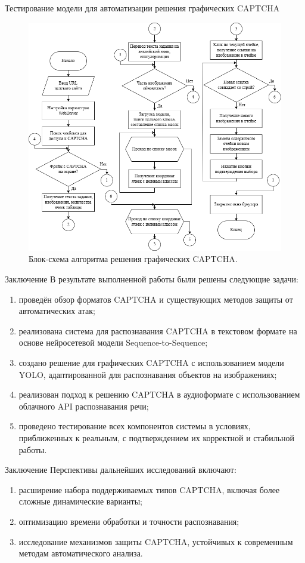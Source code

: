 \documentclass[12pt,a4paper,mathserif]{beamer}
\begin{document}
\begin{frame}{\footnotesize Тестирование модели для автоматизации решения графических CAPTCHA}
    \begin{figure}
        \centering
        \includegraphics[width=0.6\linewidth]{imgs/solve_captcha_flow.png}
        \caption{\centering Блок-схема алгоритма решения графических CAPTCHA.}
    \end{figure}
\end{frame}

\begin{frame}{Заключение}
    \setlength{\parindent}{0.5cm}
    В результате выполненной работы были решены следующие задачи:

    \begin{enumerate}
        \item проведён обзор форматов CAPTCHA и существующих методов защиты от 
        автоматических атак;
        \item реализована система для распознавания CAPTCHA в текстовом формате 
        на основе нейросетевой модели Sequence-to-Sequence;
        \item создано решение для графических CAPTCHA с использованием модели 
        YOLO, адаптированной для распознавания объектов на изображениях;
        \item реализован подход к решению CAPTCHA в аудиоформате с использованием 
        облачного API распознавания речи;
        \item проведено тестирование всех компонентов системы в условиях, 
        приближенных к реальным, с подтверждением их корректной и стабильной 
        работы.
    \end{enumerate}
\end{frame}

\begin{frame}{Заключение}
    \setlength{\parindent}{0.5cm}
    Перспективы дальнейших исследований включают:

    \begin{enumerate}
        \item расширение набора поддерживаемых типов CAPTCHA, включая более 
        сложные динамические варианты;
        \item оптимизацию времени обработки и точности распознавания;
        \item исследование механизмов защиты CAPTCHA, устойчивых к современным 
        методам автоматического анализа.
    \end{enumerate}
\end{frame}
\end{document}
